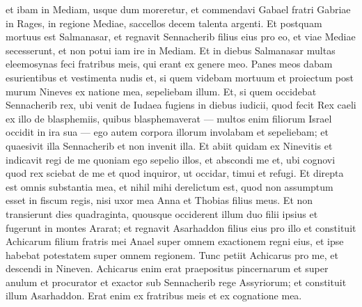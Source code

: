 \begin{biblechapter}
\verse et ibam in Mediam, usque dum moreretur, et commendavi Gabael fratri Gabriae in Rages, in regione Mediae, saccellos decem talenta argenti. 
\verse Et postquam mortuus est Salmanasar, et regnavit Sennacherib filius eius pro eo, et viae Mediae secesserunt, et non potui iam ire in Mediam. 
\verse Et in diebus Salmanasar multas eleemosynas feci fratribus meis, qui erant ex genere meo. 
\verse Panes meos dabam esurientibus et vestimenta nudis et, si quem videbam mortuum et proiectum post murum Nineves ex natione mea, sepeliebam illum. 
\verse Et, si quem occidebat Sennacherib rex, ubi venit de Iudaea fugiens in diebus iudicii, quod fecit Rex caeli ex illo de blasphemiis, quibus blasphemaverat — multos enim filiorum Israel occidit in ira sua — ego autem corpora illorum involabam et sepeliebam; et quaesivit illa Sennacherib et non invenit illa. 
\verse Et abiit quidam ex Ninevitis et indicavit regi de me quoniam ego sepelio illos, et abscondi me et, ubi cognovi quod rex sciebat de me et quod inquiror, ut occidar, timui et refugi. 
\verse Et direpta est omnis substantia mea, et nihil mihi derelictum est, quod non assumptum esset in fiscum regis, nisi uxor mea Anna et Thobias filius meus. 
\verse Et non transierunt dies quadraginta, quousque occiderent illum duo filii ipsius et fugerunt in montes Ararat; et regnavit Asarhaddon filius eius pro illo et constituit Achicarum filium fratris mei Anael super omnem exactionem regni eius, et ipse habebat potestatem super omnem regionem. 
\verse Tunc petiit Achicarus pro me, et descendi in Nineven. Achicarus enim erat praepositus pincernarum et super anulum et procurator et exactor sub Sennacherib rege Assyriorum; et constituit illum Asarhaddon. Erat enim ex fratribus meis et ex cognatione mea. 
\end{biblechapter}

